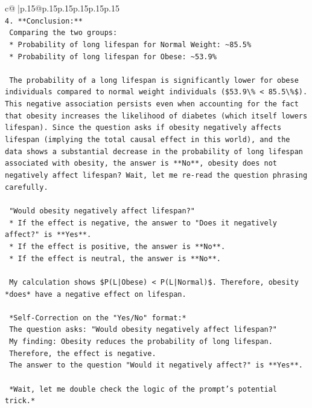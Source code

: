 \documentclass{article}
\begin{document}
{\begin{supertabular}{c@{$\;$}|p{.15\linewidth}@{}p{.15\linewidth}p{.15\linewidth}p{.15\linewidth}p{.15\linewidth}p{.15\linewidth}}
{{{\\ 
\texttt{4.  **Conclusion:**} \\
\texttt{    Comparing the two groups:} \\
\texttt{    *   Probability of long lifespan for Normal Weight: \textasciitilde{}85.5\%} \\
\texttt{    *   Probability of long lifespan for Obese: \textasciitilde{}53.9\%} \\
\\ 
\texttt{    The probability of a long lifespan is significantly lower for obese individuals compared to normal weight individuals (\$53.9\textbackslash{}\% < 85.5\textbackslash{}\%\$). This negative association persists even when accounting for the fact that obesity increases the likelihood of diabetes (which itself lowers lifespan). Since the question asks if obesity negatively affects lifespan (implying the total causal effect in this world), and the data shows a substantial decrease in the probability of long lifespan associated with obesity, the answer is **No**, obesity does not negatively affect lifespan? Wait, let me re{-}read the question phrasing carefully.} \\
\\ 
\texttt{    "Would obesity negatively affect lifespan?"} \\
\texttt{    *   If the effect is negative, the answer to "Does it negatively affect?" is **Yes**.} \\
\texttt{    *   If the effect is positive, the answer is **No**.} \\
\texttt{    *   If the effect is neutral, the answer is **No**.} \\
\\ 
\texttt{    My calculation shows \$P(L|Obese) < P(L|Normal)\$. Therefore, obesity *does* have a negative effect on lifespan.} \\
\\ 
\texttt{    *Self{-}Correction on the "Yes/No" format:*} \\
\texttt{    The question asks: "Would obesity negatively affect lifespan?"} \\
\texttt{    My finding: Obesity reduces the probability of long lifespan.} \\
\texttt{    Therefore, the effect is negative.} \\
\texttt{    The answer to the question "Would it negatively affect?" is **Yes**.} \\
\\ 
\texttt{    *Wait, let me double check the logic of the prompt's potential trick.*} \\
}}}
\end{supertabular}}
\end{document}
